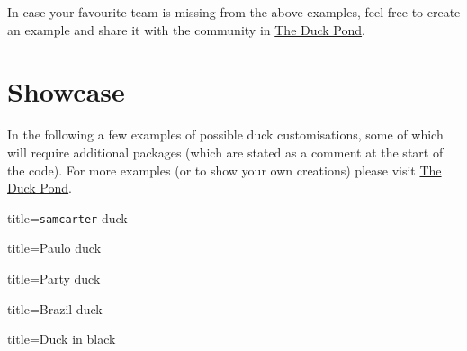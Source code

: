 \documentclass[parskip=half]{scrartcl}
\begin{document}
In case your favourite team is missing from the above examples, feel free to create an example and share it with the community in \href{https://tex.stackexchange.com/q/387047/36296}{The Duck Pond}. 

\clearpage
\section{Showcase}

In the following a few examples of possible duck customisations, some of which will require additional packages (which are stated as a comment at the start of the code). For more examples (or to show your own creations) please visit \href{https://tex.stackexchange.com/q/387047/36296}{The Duck Pond}.

\begin{tcblisting}{title={\texttt{samcarter} duck}}
\begin{tikzpicture}
	\duck[body=yellow!50!brown!50!white, 
		longhair=red!50!brown, 
		jacket=blue!50!black]
\end{tikzpicture}
\end{tcblisting}

\begin{tcblisting}{title={Paulo duck}}
\end{tcblisting}

\begin{tcblisting}{title={Party duck}}
\begin{tikzpicture}
  \duck[cake=violet,
  			magichat=violet,
  			magicstars=white!85!yellow]
\end{tikzpicture}	
\end{tcblisting}

\begin{tcblisting}{title={Brazil duck}}
\end{tcblisting}

\begin{tcblisting}{title={Duck in black}}
\begin{tikzpicture}
	\duck[grumpy, body=yellow!50!brown!50!white, tshirt=white, jacket=black, tie=black, hat=black, sunglasses=black]
\end{tikzpicture}
\end{tcblisting}
\end{document}
